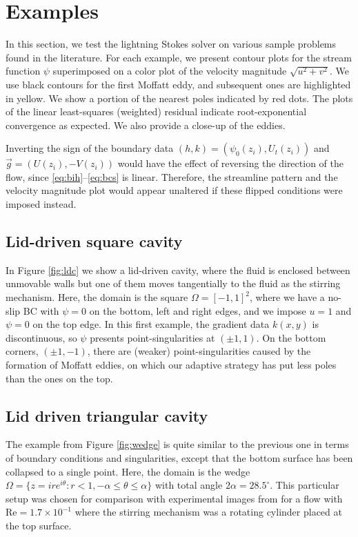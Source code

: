 
\section{Examples \label{sec:results}}
In this section, we test the lightning Stokes solver on various sample problems found in the literature. For each example, we present contour plots for the stream function $\psi$ superimposed on a color plot of the velocity magnitude $\sqrt{u^2+v^2}$. We use black contours for the first Moffatt eddy, and subsequent ones are highlighted in yellow. We show a portion of the nearest poles indicated by red dots. The plots of the linear least-squares (weighted) residual indicate root-exponential convergence as expected. We also provide a close-up of the eddies.

Inverting the sign of the boundary data $(h,k)=(\psi_0(z_i), U_t(z_i))$ and $\vec{g}=(U(z_i), -V(z_i))$ would have the effect of reversing the direction of the flow, since \eqref{eq:bih}--\eqref{eq:bcs} is linear. Therefore, the streamline pattern and the velocity magnitude plot would appear unaltered if these flipped conditions were imposed instead.   

\subsection{Lid-driven square cavity}
In Figure \ref{fig:ldc} we show a lid-driven cavity, where the fluid is enclosed between unmovable walls but one of them moves tangentially to the fluid as the stirring mechanism. Here, the domain is the square $\Omega=[-1,1]^2$, where we have a no-slip BC with $\psi=0$ on the bottom, left and right edges, and we impose $u=1$ and $\psi=0$ on the top edge. In this first example, the gradient data $k(x,y)$ is discontinuous, so $\psi$ presents point-singularities at $(\pm 1, 1)$. On the bottom corners, $(\pm 1,-1)$, there are (weaker) point-singularities caused by the formation of Moffatt eddies, on which our adaptive strategy has put less poles than the ones on the top.


\subsection{Lid driven triangular cavity}
The example from Figure \ref{fig:wedge} is quite similar to the previous one in terms of boundary conditions and singularities, except that the bottom surface has been collapsed to a single point. Here, the domain is the wedge $\Omega = \{z= i r e^{i\theta}: r<1, -\alpha \leq \theta\leq \alpha\}$ with total angle $2\alpha = 28.5^\circ$. This particular setup was chosen for comparison with experimental images from \cite{taneda79} for a flow with $\text{Re}=1.7\times10^{-1}$ where the stirring mechanism was a rotating cylinder placed at the top surface.

